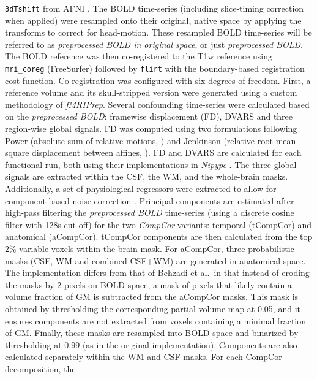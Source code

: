 \documentclass[
]{article}
\begin{document}
\begin{description}
\texttt{3dTshift} from AFNI \citep[RRID:SCR\_005927]{afni}. The BOLD
time-series (including slice-timing correction when applied) were
resampled onto their original, native space by applying the transforms
to correct for head-motion. These resampled BOLD time-series will be
referred to as \emph{preprocessed BOLD in original space}, or just
\emph{preprocessed BOLD}. The BOLD reference was then co-registered to
the T1w reference using \texttt{mri\_coreg} (FreeSurfer) followed by
\texttt{flirt} \citep[FSL 6.0.5.1:57b01774,][]{flirt} with the
boundary-based registration \citep{bbr} cost-function. Co-registration
was configured with six degrees of freedom. First, a reference volume
and its skull-stripped version were generated using a custom methodology
of \emph{fMRIPrep}. Several confounding time-series were calculated
based on the \emph{preprocessed BOLD}: framewise displacement (FD),
DVARS and three region-wise global signals. FD was computed using two
formulations following Power (absolute sum of relative motions,
\citet{power_fd_dvars}) and Jenkinson (relative root mean square
displacement between affines, \citet{mcflirt}). FD and DVARS are
calculated for each functional run, both using their implementations in
\emph{Nipype} \citep[following the definitions by][]{power_fd_dvars}.
The three global signals are extracted within the CSF, the WM, and the
whole-brain masks. Additionally, a set of physiological regressors were
extracted to allow for component-based noise correction
\citep[\emph{CompCor},][]{compcor}. Principal components are estimated
after high-pass filtering the \emph{preprocessed BOLD} time-series
(using a discrete cosine filter with 128s cut-off) for the two
\emph{CompCor} variants: temporal (tCompCor) and anatomical (aCompCor).
tCompCor components are then calculated from the top 2\% variable voxels
within the brain mask. For aCompCor, three probabilistic masks (CSF, WM
and combined CSF+WM) are generated in anatomical space. The
implementation differs from that of Behzadi et al.~in that instead of
eroding the masks by 2 pixels on BOLD space, a mask of pixels that
likely contain a volume fraction of GM is subtracted from the aCompCor
masks. This mask is obtained by thresholding the corresponding partial
volume map at 0.05, and it ensures components are not extracted from
voxels containing a minimal fraction of GM. Finally, these masks are
resampled into BOLD space and binarized by thresholding at 0.99 (as in
the original implementation). Components are also calculated separately
within the WM and CSF masks. For each CompCor decomposition, the

\end{description}
\end{document}
